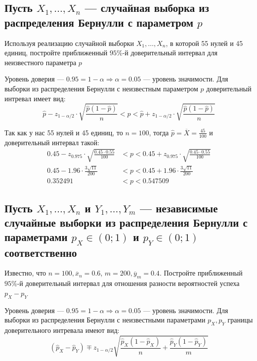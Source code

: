 \documentclass{article}
\begin{document}
\subsection{Пусть $X_{1}, \ldots, X_{n}$ — случайная выборка из распределения Бернулли с параметром $p$}
Используя реализацию случайной выборки $X_{1}, \ldots, X_{n}$, в которой 55 нулей и 45 единиц, постройте приближенный $95 \%$-й доверительный интервал для неизвестного параметра $p$

Уровень доверия — $0.95=1-\alpha\Longrightarrow\alpha=0.05$ — уровень значимости. Для выборки из распределения Бернулли с неизвестным параметром $p$ доверительный интревал имеет вид:
\begin{equation*}
    \widehat{p}-z_{1-\alpha/2}\cdot\sqrt{\frac{\widehat{p}(1-\widehat{p})}{n}}<p<\widehat{p}+z_{1-\alpha/2}\cdot\sqrt{\frac{\widehat{p}(1-\widehat{p})}{n}}
\end{equation*}

Так как у нас 55 нулей и 45 единиц, то $n=100$, тогда $\widehat{p}=\overline{X}=\frac{45}{100}$ и доверительный интервал такой:
\begin{equation*}
    \begin{aligned}
        0.45-z_{0.975}\cdot\sqrt{\frac{0.45\cdot0.55}{100}}&<p<0.45+z_{0.975}\cdot\sqrt{\frac{0.45\cdot0.55}{100}}\\
        0.45-1.96\cdot\frac{3\sqrt{11}}{200}&<p<0.45+1.96\cdot\frac{3\sqrt{11}}{200}\\
        0.352491&<p<0.547509
    \end{aligned}
\end{equation*}

\subsection{Пусть $X_{1}, \ldots, X_{n}$ и $Y_{1}, \ldots, Y_{m}$ — независимые случайные выборки из распределения Бернулли с параметрами $p_{X} \in(0 ; 1)$ и $p_{Y} \in(0 ; 1)$ соответственно}
Известно, что $n=100, \overline{x}_{n}=0.6$, $m=200, \overline{y}_{m}=0.4$. Постройте приближенный $95 \%$-й доверительный интервал для отношения разности вероятностей успеха $p_{X}-p_{Y}$

Уровень доверия — $0.95=1-\alpha\Longrightarrow\alpha=0.05$ — уровень значимости. Для выборки из распределения Бернулли с неизвестными параметрами $p_X,p_Y$ границы доверительного интревала имеют вид:
\begin{equation*}
    \left(\widehat{p}_X-\widehat{p}_Y\right)\mp z_{1-\alpha/2}\sqrt{\frac{\widehat{p}_X(1-\widehat{p}_X)}{n}+\frac{\widehat{p}_Y(1-\widehat{p}_Y)}{m}}
\end{equation*}
\end{document}

